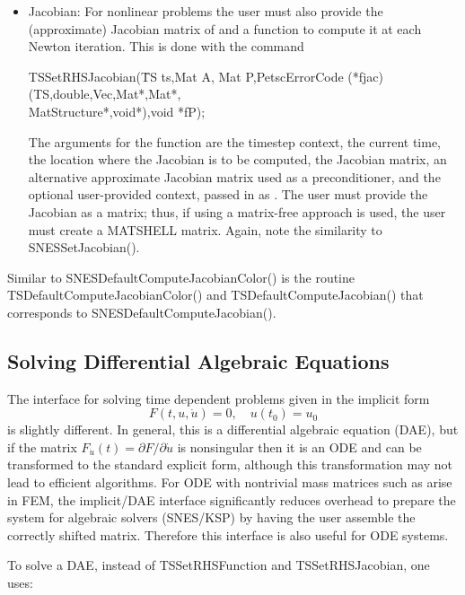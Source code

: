 \begin{itemize}
\item Jacobian: For nonlinear problems the user must also provide the 
(approximate) Jacobian matrix of  and a function to
compute it at each Newton iteration. This is done with the command
\begin{tabbing}
 TSSetRHSJacobian(\=TS ts,Mat A, Mat P,PetscErrorCode (*fjac)(TS,double,Vec,Mat*,Mat*,\\
                  \>        MatStructure*,void*),void *fP);
\end{tabbing}
The arguments for the function  are
the timestep context, the current time, the location where the
Jacobian is to be computed, the Jacobian matrix, an alternative
approximate Jacobian matrix used as a preconditioner, and the optional
user-provided context, passed in as . The user must provide the 
Jacobian as a matrix; thus, if using a matrix-free approach is used, the
user must create a MATSHELL matrix. Again, note the similarity
to SNESSetJacobian().
\end{itemize}

Similar to SNESDefaultComputeJacobianColor() is the
routine TSDefaultComputeJacobianColor() and TSDefaultComputeJacobian() that 
corresponds to SNESDefaultComputeJacobian().

\subsection{Solving Differential Algebraic Equations}
\label{sec_dae}
The interface for solving time dependent problems given in the implicit
form
\[
        F(t,u,\dot{u}) = 0, \quad u(t_0) = u_0
\]
is slightly different.  In general, this is a differential algebraic
equation (DAE), but if the matrix $F_{\dot{u}}(t) = \partial F
/ \partial \dot{u}$ is nonsingular then it is an ODE and can be
transformed to the standard explicit form, although this transformation
may not lead to efficient algorithms.  For ODE with nontrivial mass
matrices such as arise in FEM, the implicit/DAE interface significantly
reduces overhead to prepare the system for algebraic solvers (SNES/KSP)
by having the user assemble the correctly shifted matrix.  Therefore
this interface is also useful for ODE systems.

To solve a DAE, instead of TSSetRHSFunction and TSSetRHSJacobian, one
uses:

